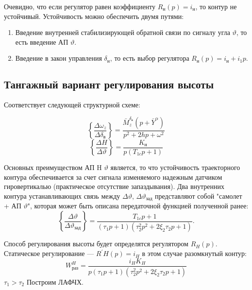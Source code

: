 \documentclass{article}
\begin{document}
Очевидно, что если регулятор равен коэффициенту $R_\text{н}(p)  = i_\text{н}$,
то контур не устойчивый.
Устойчивость можно обеспечить двумя путями:

\begin{enumerate}
	\item Введение внутренней стабилизирующей обратной связи по сигналу угла
	      $\vartheta$, то есть введение АП $\vartheta$.
	\item Введение в закон управления $\delta_\text{н}$, то есть выбор
	      регулятора $R_\text{н}(p) = i_\text{н} + i_1p$.
\end{enumerate}

\subsection{Тангажный вариант регулирования высоты}
Соответствует следующей структурной схеме:

\begin{figure}[H]
	\centering
	\label{fig:fig_51}
\end{figure}

\[
	\left\{\frac{\Delta \omega_z}{\Delta \delta_\text{в}} \right\} =
	\frac{\bar{M}_z^{\delta_\text{в}}(p + \bar{Y}^\alpha)}{p^2 + 2hp +
	\omega^2}
\]
\[
	\left\{ \frac{\Delta H}{\Delta \vartheta} \right\} =
	\frac{K_\text{н}}{p(T_{1c}p +1)}
\]

Основных преимуществом АП H $\vartheta$ является, то что устойчивость
траекторного контура обеспечивается за счет сигнала изменяемого надежным
датчиком гировертикалью (практическое отсутствие запаздывания). Два внутренних
контура устанавливающих связь между $\Delta \vartheta$, $\Delta
	\vartheta_\text{зад}$ представляют собой "самолет + АП $\vartheta$", которая
может быть описана передаточной функцией полученной ранее:
\[
	\left\{\frac{\Delta \vartheta}{\Delta \vartheta_\text{зад}} \right\}
	=\frac{T_{1c}p + 1}{(\tau_1 p + 1) (\tau_2^2p^2 + 2 \xi_2 \tau_2 p + 1)}.
\]
\begin{figure}[H]
	\centering
	\label{fig:fig_52}
\end{figure}
Способ регулирования высоты будет определятся регулятором $R_H(p)$.
Статическое регулирование --- $R^{'}H(p) = i_H$ в этом случае разомкнутый
контур:
\[
	W_\text{раз}^H =\frac{i_H K_H}{p(\tau_1 p + 1)(\tau_2^2 p^2 + 2 \xi_2
		\tau_2 p + 1)}
\]
$\tau_1 > \tau_2$
Построим ЛАФЧХ.

\begin{figure}[H]
	\centering
	\label{fig:fig_53}
\end{figure}
\end{document}
